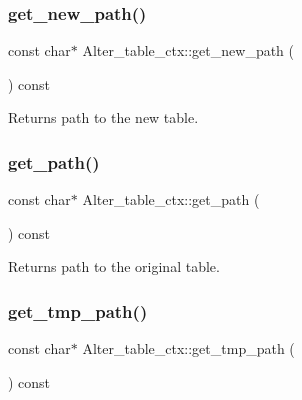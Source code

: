 \subsubsection{\texorpdfstring{get\+\_\+new\+\_\+path()}{get\_new\_path()}}
{\footnotesize\ttfamily const char$\ast$ Alter\+\_\+table\+\_\+ctx\+::get\+\_\+new\+\_\+path (\begin{DoxyParamCaption}{ }\end{DoxyParamCaption}) const\hspace{0.3cm}{\ttfamily [inline]}}

\begin{DoxyReturn}{Returns}
path to the new table. 
\end{DoxyReturn}
\mbox{\label{classAlter__table__ctx_acd2655d17b12e8f08c483cf013f51e21}} 
\subsubsection{\texorpdfstring{get\+\_\+path()}{get\_path()}}
{\footnotesize\ttfamily const char$\ast$ Alter\+\_\+table\+\_\+ctx\+::get\+\_\+path (\begin{DoxyParamCaption}{ }\end{DoxyParamCaption}) const\hspace{0.3cm}{\ttfamily [inline]}}

\begin{DoxyReturn}{Returns}
path to the original table. 
\end{DoxyReturn}
\mbox{\label{classAlter__table__ctx_a016d66cd2dff6af09c6f8fd0e33979e6}} 
\subsubsection{\texorpdfstring{get\+\_\+tmp\+\_\+path()}{get\_tmp\_path()}}
{\footnotesize\ttfamily const char$\ast$ Alter\+\_\+table\+\_\+ctx\+::get\+\_\+tmp\+\_\+path (\begin{DoxyParamCaption}{ }\end{DoxyParamCaption}) const\hspace{0.3cm}{\ttfamily [inline]}}

